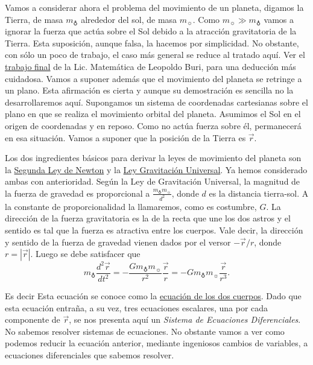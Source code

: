 Vamos a considerar ahora el problema del movimiento de un planeta, digamos la Tierra, de masa $m_{\earth}$ alrededor del sol, de masa $m_{\sun}$. Como
$m_{\sun}\gg m_{\earth}$ vamos a ignorar la fuerza que actúa sobre el Sol debido a la atracción gravitatoria de la Tierra. Esta suposición, aunque falsa, la hacemos
por simplicidad. No obstante, con sólo un poco de trabajo, el caso más general se reduce al tratado aquí. Ver el \href{https://drive.google.com/file/d/0B80iJ0HgObRRbUtUQ2hFQ0FlTG8/view}{trabajo final} de la Lic. Matemática de Leopoldo Buri,
para una deducción más cuidadosa. Vamos a suponer además que el movimiento del planeta se retringe a un plano. Esta afirmación es cierta y aunque su demostración
es sencilla no la desarrollaremos aquí.
Supongamos un sistema de coordenadas cartesianas sobre el plano en que se realiza el movimiento orbital del planeta. Asumimos el Sol en el origen de coordenadas y en
reposo. Como no actúa fuerza sobre él, permanecerá en esa situación. Vamos a suponer que la posición de la Tierra es $\vec{r}$.

Los dos ingredientes básicos para derivar la leyes de movimiento del planeta son la
\href{http://es.wikipedia.org/wiki/Leyes_de_Newton\#Segunda_ley_de_Newton_o_ley_de_fuerza}{Segunda Ley de Newton} y la
\href{http://es.wikipedia.org/wiki/Ley_de_gravitación_universal}{Ley Gravitación Universal}. Ya hemos considerado ambas con anterioridad.
Según la Ley de Gravitación Universal, la magnitud de la fuerza de gravedad es proporcional a $\frac{m_{\earth}m_{\sun}}{d^2}$, donde $d$ es la distancia tierra-sol.
A la constante de proporcionalidad la llamaremos, como es costumbre, $G$. La dirección de la fuerza gravitatoria es la de la recta que une los dos astros y
el sentido es tal que la fuerza es atractiva entre los cuerpos. Vale decir, la dirección y sentido de la
fuerza de gravedad vienen dados por el versor $-\vec{r}/r$, donde $r=|\vec{r}|$. Luego se debe satisfacer que
\[m_{\earth}\frac{d^2\vec{r}}{dt^2}=-\frac{Gm_{\earth}m_{\sun}}{r^2}\frac{\vec{r}}{r}=-Gm_{\earth}m_{\sun}\frac{\vec{r}}{r^3}. \]


Es decir
Esta ecuación se conoce como la \href{http://es.wikipedia.org/wiki/Problema_de_los_dos_cuerpos}{ecuación de los dos cuerpos}.
Dado que esta ecuación entraña, a su vez, tres ecuaciones escalares, una por cada
componente de $\vec{r}$, se nos presenta aquí un \emph{Sistema de Ecuaciones Diferenciales}. No sabemos resolver sistemas de ecuaciones. No obstante vamos
a ver como podemos reducir la ecuación anterior, mediante ingeniosos cambios de
variables, a ecuaciones diferenciales que sabemos resolver.


